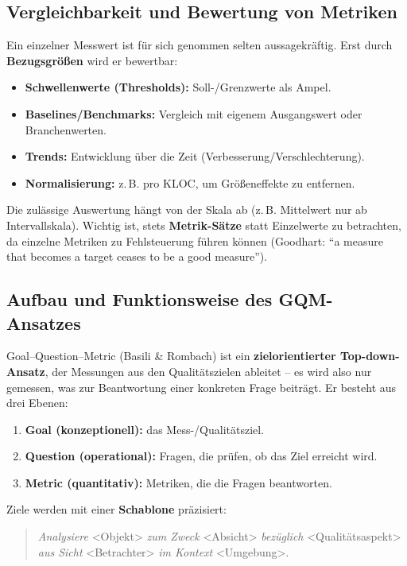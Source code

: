 \documentclass[
	fontsize=12pt,          %
	paper=a4,               %
	numbers=noenddot,       %
	listof=totoc,           %
	listof=entryprefix,     %
	listof=nochaptergap,    %
	bibliography=totoc,     %
	parskip=half,           %
	openany                 %
]{scrbook}
\begin{document}
\subsection*{Vergleichbarkeit und Bewertung von Metriken}

Ein einzelner Messwert ist für sich genommen selten aussagekräftig. Erst durch
\textbf{Bezugsgrößen} wird er bewertbar:

\begin{itemize}
	\item \textbf{Schwellenwerte (Thresholds):} Soll-/Grenzwerte als Ampel.
	\item \textbf{Baselines/Benchmarks:} Vergleich mit eigenem Ausgangswert oder
	      Branchenwerten.
	\item \textbf{Trends:} Entwicklung über die Zeit (Verbesserung/Verschlechterung).
	\item \textbf{Normalisierung:} z.\,B. pro KLOC, um Größeneffekte zu entfernen.
\end{itemize}

Die zulässige Auswertung hängt von der Skala ab (z.\,B. Mittelwert nur ab
Intervallskala). Wichtig ist, stets \textbf{Metrik-Sätze} statt Einzelwerte zu
betrachten, da einzelne Metriken zu Fehlsteuerung führen können
(Goodhart: ``a measure that becomes a target ceases to be a good measure'').

\subsection*{Aufbau und Funktionsweise des GQM-Ansatzes}

Goal--Question--Metric (Basili \& Rombach) ist ein \textbf{zielorientierter
Top-down-Ansatz}, der Messungen aus den Qualitätszielen ableitet -- es wird also
nur gemessen, was zur Beantwortung einer konkreten Frage beiträgt. Er besteht aus
drei Ebenen:

\begin{enumerate}
	\item \textbf{Goal (konzeptionell):} das Mess-/Qualitätsziel.
	\item \textbf{Question (operational):} Fragen, die prüfen, ob das Ziel
	      erreicht wird.
	\item \textbf{Metric (quantitativ):} Metriken, die die Fragen beantworten.
\end{enumerate}

Ziele werden mit einer \textbf{Schablone} präzisiert:

\begin{quote}
	\emph{Analysiere} \textless Objekt\textgreater{} \emph{zum Zweck}
	\textless Absicht\textgreater{} \emph{bezüglich}
	\textless Qualitätsaspekt\textgreater{} \emph{aus Sicht}
	\textless Betrachter\textgreater{} \emph{im Kontext}
	\textless Umgebung\textgreater.
\end{quote}
\end{document}
